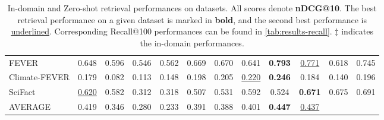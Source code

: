 \begin{table}[t!]
{\begin{tabular}{l | c | c | c c c c c | c c | c c }
   FEVER         & 0.648 & 0.596 & 0.546 & 0.562 & 0.669 & 0.670 & 0.641 & \textbf{0.793} & \underline{0.771} & 0.618 & \colorbox{green!30}{0.745} \\ 
   Climate-FEVER & 0.179 & 0.082 & 0.113 & 0.148 & 0.198 & 0.205 & \underline{0.220} & \textbf{0.246} & 0.184 & 0.140 & 0.196 \\ 
   SciFact       & \underline{0.620} & 0.582 & 0.312 & 0.318 & 0.507 & 0.531 & 0.592 & 0.524 & \textbf{0.671} & 0.675 & \colorbox{blue!30}{0.691} \\ \midrule
   AVERAGE       & 0.419 & 0.346 & 0.280 & 0.233 & 0.391 & 0.388 & 0.401 & \textbf{0.447} & \underline{0.437} \\ 
        \bottomrule
    \end{tabular}}
    \caption{In-domain and Zero-shot retrieval performances on \beir datasets. All scores denote \textbf{nDCG@10}. The best retrieval performance on a given dataset is marked in \textbf{bold}, and the second best performance is \underline{underlined}. Corresponding Recall@100 performances can be found in \autoref{tab:results-recall}. $\ddagger$ indicates the in-domain performances.}
    \label{tab:results}
\end{table}

